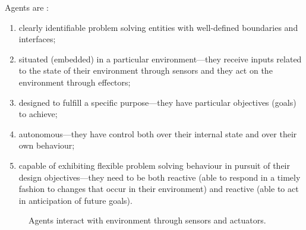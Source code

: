 \documentclass[11pt,oneside,a4paper,openright]{report}
\begin{document}
Agents are \cite[p.115-152]{WooldridgeJennings1995}:
\begin{enumerate}[i-]
 \item clearly identifiable problem solving entities with well-defined boundaries and
interfaces;
\item situated (embedded) in a particular environment—they receive inputs related to the
state of their environment through sensors and they act on the environment through
effectors;
\item designed to fulfill a specific purpose—they have particular objectives (goals) to
achieve;
\item autonomous—they have control both over their internal state and over their own
behaviour;
\item capable of exhibiting flexible problem solving behaviour in pursuit of their design
objectives—they need to be both reactive (able to respond in a timely fashion to
changes that occur in their environment) and reactive (able to act in anticipation of
future goals).
\end{enumerate}


	\begin{figure}[h]
	\centering
	\setlength\fboxsep{0pt}
	\setlength\fboxrule{0.5pt}
	\caption{Agents interact with environment through sensors and actuators.}
	\label{fig:AgWool}
	\end{figure}

\end{document}
